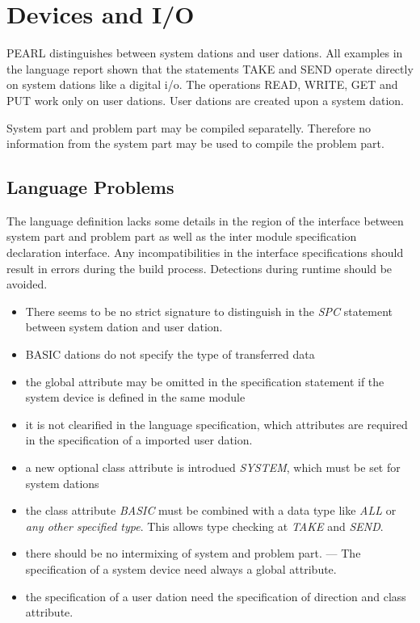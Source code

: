 \chapter{Devices and I/O}

PEARL distinguishes between system dations and user dations.
All examples in the language report shown that the statements TAKE and SEND
operate directly on system dations like a digital i/o.
The operations READ, WRITE, GET and PUT work only on user dations.
User dations are created upon a system dation.

System part and problem part may be compiled separatelly. Therefore 
no information from the system part may be used to compile the problem part.

\section{Language Problems}
The language definition lacks some details in the region of the
interface between system part and problem part as well as the 
inter module specification declaration interface.
Any incompatibilities in the interface specifications should result in
errors during the build process. Detections during runtime should be avoided.

\begin{itemize}
\item There seems to be no strict signature to distinguish
 in the {\em SPC} statement between system dation and user dation.
\item BASIC dations do not specify the type of transferred data
\item the global attribute may be omitted in the specification statement
  if the system device is defined in the same module
\item it is not clearified in the language specification, which attributes
   are required in the specification of a imported user dation.
\item a new optional class attribute is introdued {\em SYSTEM}, which
   must be set for system dations
\item the class attribute {\em BASIC} must be combined with a data type
    like {\em ALL} or {\em any other specified type}. This allows
    type checking at {\em TAKE} and {\em SEND}.
\item there should be no intermixing of system and problem part.  ---
   The specification of a system device need always a global attribute.
\item the specification of a user dation need the specification of direction
   and class attribute.
\end{itemize}

